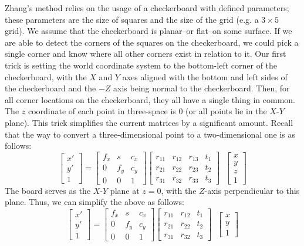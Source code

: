 \documentclass[
    12pt,
    twoside,
    bibstyle=chicago,
    headerstyle=uppercase,
	bibfile=biblatex_updating.bib
]{reedthesis}
\begin{document}
Zhang's method relies on the usage of a checkerboard with defined parameters; these parameters are the size of squares and the size of the grid (e.g. a $3\times5$ grid). We assume that the checkerboard is planar--or flat--on some surface. If we are able to detect the corners of the squares on the checkerboard, we could pick a single corner and know where all other corners exist in relation to it. Our first trick is setting the world coordinate system to the bottom-left corner of the checkerboard, with the $X$ and $Y$ axes aligned with the bottom and left sides of the checkerboard and the $-Z$ axis being normal to the checkerboard. Then, for all corner locations on the checkerboard, they all have a single thing in common. The $z$ coordinate of each point in three-space is 0 (or all points lie in the $X$-$Y$ plane). This trick simplifies the current matrices by a significant amount. Recall that the way to convert a three-dimensional point to a two-dimensional one is as follows:
\[\begin{bmatrix}x' \\ y' \\ 1\end{bmatrix} = \begin{bmatrix}f_x & s & c_x \\ 0 & f_y & c_y \\ 0 & 0 & 1\end{bmatrix} \begin{bmatrix} r_{11}&r_{12}&r_{13}&t_{1}\\r_{21}&r_{22}&r_{23}&t_{2}\\r_{31}&r_{32}&r_{33}&t_{3}\end{bmatrix}\;\;\begin{bmatrix}x \\ y \\ z \\ 1\end{bmatrix}\]
The board serves as the $X$-$Y$ plane at $z=0$, with the $Z$-axis perpendicular to this plane. Thus, we can simplify the above as follows:
\[\begin{bmatrix}x' \\ y' \\ 1\end{bmatrix} = \begin{bmatrix}f_x & s & c_x \\ 0 & f_y & c_y \\ 0 & 0 & 1\end{bmatrix} \begin{bmatrix} r_{11}&r_{12}&t_{1}\\r_{21}&r_{22}&t_{2}\\r_{31}&r_{32}&t_{3}\end{bmatrix}\;\;\begin{bmatrix}x \\ y \\ 1\end{bmatrix} \]
\end{document}
